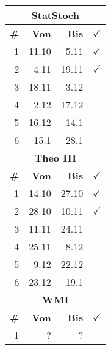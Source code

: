 \documentclass{article}
\begin{document}
\begin{table}
\begin{tabular}{r|r|r|l}
        \multicolumn{4}{c}{\textbf{StatStoch}}\\
        \hline
        \hline
        \textbf{\#}&
        \textbf{Von}&
        \textbf{Bis}&
        $\checkmark$\\
        \hline
        \hline
        \color{teal}
        1&11.10&5.11&$\checkmark$\\
        \color{teal}
        2&4.11&19.11&$\checkmark$\\
        \color{teal}
        3&18.11&3.12\\
        4&2.12&17.12\\
        5&16.12&14.1\\
        6&15.1&28.1\\
        \hline
        \hline

        \multicolumn{4}{c}{\textbf{Theo III}}\\
        \hline
        \hline
        \textbf{\#}&
        \textbf{Von}&
        \textbf{Bis}&
        $\checkmark$\\
        \hline
        \hline
        \color{teal}
        1&14.10&27.10&$\checkmark$\\
        \color{teal}
        2&28.10&10.11&$\checkmark$\\
        \color{teal}
        3&11.11&24.11\\
        4&25.11&8.12\\
        5&9.12&22.12\\
        6&23.12&19.1\\
        \hline
        \hline

        \multicolumn{4}{c}{\textbf{WMI}}\\
        \hline
        \hline
        \textbf{\#}&
        \textbf{Von}&
        \textbf{Bis}&
        $\checkmark$\\
        \hline
        \hline
        1&?&?
    \end{tabular}
\end{table}
\end{document}
